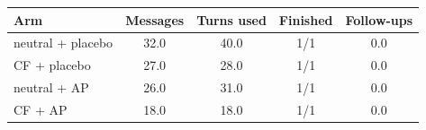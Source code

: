 \begin{tabular}{lcccc}
\toprule
Arm & Messages & Turns used & Finished & Follow-ups \\
\midrule
neutral + placebo & 32.0 & 40.0 & 1/1 & 0.0 \\
CF + placebo & 27.0 & 28.0 & 1/1 & 0.0 \\
neutral + AP & 26.0 & 31.0 & 1/1 & 0.0 \\
CF + AP & 18.0 & 18.0 & 1/1 & 0.0 \\
\bottomrule
\end{tabular}
